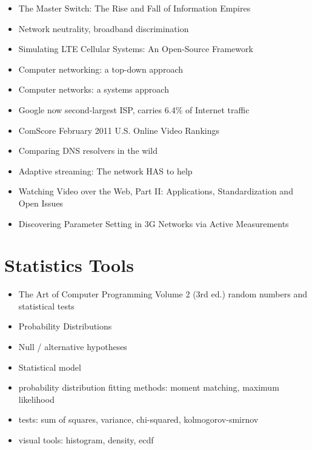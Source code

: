 \begin{itemize}
\item The Master Switch: The Rise and Fall of Information Empires \cite{wu2010master}
\item Network neutrality, broadband discrimination \cite{wu2003network}
\item Simulating LTE Cellular Systems: An Open-Source Framework \cite{5634134}
\item Computer networking: a top-down approach \cite{kurose2008computer}
\item Computer networks: a systems approach \cite{peterson2007computer}
\item Google now second-largest ISP, carries 6.4\% of Internet traffic \cite{nw2010carrier}
\item ComScore February 2011 U.S. Online Video Rankings \cite{comscore2011ranking}
\item Comparing DNS resolvers in the wild \cite{ager2010comparing}
\item Adaptive streaming: The network HAS to help \cite{BLTJ:BLTJ20505}
\item Watching Video over the Web, Part II: Applications, Standardization and Open Issues \cite{watching-video2}
\item Discovering Parameter Setting in 3G Networks via Active Measurements \cite{4640935}
\end{itemize}

\section{Statistics Tools}

\begin{itemize}
\item The Art of Computer Programming Volume 2 (3rd ed.) random numbers and statistical tests\cite{Knuth:1997:ACP:270146}
\item Probability Distributions
\item Null / alternative hypotheses
\item Statistical model
\item probability distribution fitting
		methods: moment matching, maximum likelihood
\item tests: sum of squares, variance, chi-squared, kolmogorov-smirnov
\item visual tools: histogram, density, ecdf

\end{itemize}



